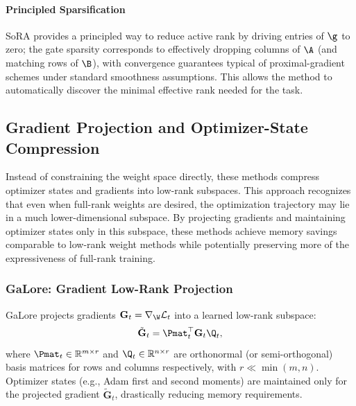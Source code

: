 \paragraph{Principled Sparsification}
SoRA provides a principled way to reduce active rank by driving entries of $\g$ to zero; the gate sparsity corresponds to effectively dropping columns of $\A$ (and matching rows of $\B$), with convergence guarantees typical of proximal-gradient schemes under standard smoothness assumptions. This allows the method to automatically discover the minimal effective rank needed for the task.

\subsection{Gradient Projection and Optimizer-State Compression}
\label{subsec:galore}

Instead of constraining the weight space directly, these methods compress optimizer states and gradients into low-rank subspaces. This approach recognizes that even when full-rank weights are desired, the optimization trajectory may lie in a much lower-dimensional subspace. By projecting gradients and maintaining optimizer states only in this subspace, these methods achieve memory savings comparable to low-rank weight methods while potentially preserving more of the expressiveness of full-rank training.

\subsubsection{GaLore: Gradient Low-Rank Projection}
\label{subsubsec:galore}

GaLore projects gradients $\mathbf{G}_t=\nabla_{\W}\mathcal{L}_t$ into a learned low-rank subspace:
\begin{equation}
  \tilde{\mathbf{G}}_t = \Pmat_t^\top \mathbf{G}_t \Q_t,
\end{equation}
where $\Pmat_t\in\mathbb{R}^{m\times r}$ and $\Q_t\in\mathbb{R}^{n\times r}$ are orthonormal (or semi-orthogonal) basis matrices for rows and columns respectively, with $r\ll\min(m,n)$. Optimizer states (e.g., Adam first and second moments) are maintained only for the projected gradient $\tilde{\mathbf{G}}_t$, drastically reducing memory requirements.

